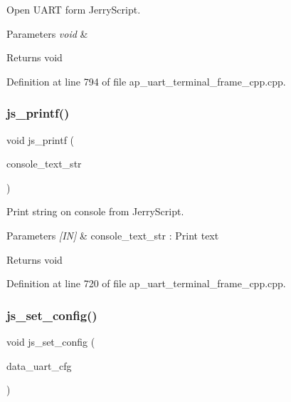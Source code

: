 Open U\+A\+RT form Jerry\+Script. 


\begin{DoxyParams}{Parameters}
{\em void} & \\
\hline
\end{DoxyParams}
\begin{DoxyReturn}{Returns}
void 
\end{DoxyReturn}


Definition at line 794 of file ap\+\_\+uart\+\_\+terminal\+\_\+frame\+\_\+cpp.\+cpp.

\mbox{\label{group___u_a_r_t__terminal_ga1a83f6bffb6e4e77a0615e7b0f3b96cd}} 
\subsubsection{js\_printf()}
{\footnotesize\ttfamily void js\+\_\+printf (\begin{DoxyParamCaption}\item[{wx\+String}]{console\+\_\+text\+\_\+str }\end{DoxyParamCaption})}



Print string on console from Jerry\+Script. 


\begin{DoxyParams}{Parameters}
{\em \mbox{[}\+I\+N\mbox{]}} & console\+\_\+text\+\_\+str \+: Print text \\
\hline
\end{DoxyParams}
\begin{DoxyReturn}{Returns}
void 
\end{DoxyReturn}


Definition at line 720 of file ap\+\_\+uart\+\_\+terminal\+\_\+frame\+\_\+cpp.\+cpp.

\mbox{\label{group___u_a_r_t__terminal_gad524224473a31a3b6deec56509559601}} 
\subsubsection{js\_set\_config()}
{\footnotesize\ttfamily void js\+\_\+set\+\_\+config (\begin{DoxyParamCaption}\item[{\textbf{ uart\+\_\+cfg\+\_\+t}}]{data\+\_\+uart\+\_\+cfg }\end{DoxyParamCaption})}



